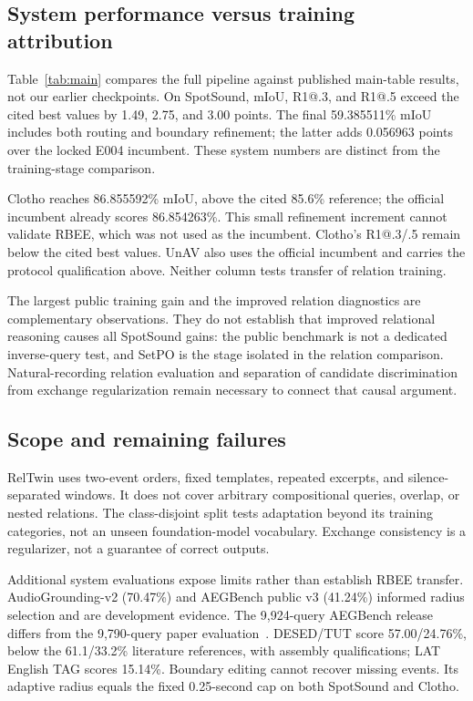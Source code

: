 \subsection{System performance versus training attribution}
Table~\ref{tab:main} compares the full pipeline against published main-table results, not our earlier checkpoints. On SpotSound, mIoU, R1@.3, and R1@.5 exceed the cited best values by 1.49, 2.75, and 3.00 points. The final 59.385511\% mIoU includes both routing and boundary refinement; the latter adds 0.056963 points over the locked E004 incumbent. These system numbers are distinct from the training-stage comparison.

Clotho reaches 86.855592\% mIoU, above the cited 85.6\% reference; the official incumbent already scores 86.854263\%. This small refinement increment cannot validate RBEE, which was not used as the incumbent. Clotho's R1@.3/.5 remain below the cited best values. UnAV also uses the official incumbent and carries the protocol qualification above. Neither column tests transfer of relation training.

The largest public training gain and the improved relation diagnostics are complementary observations. They do not establish that improved relational reasoning causes all SpotSound gains: the public benchmark is not a dedicated inverse-query test, and SetPO is the stage isolated in the relation comparison. Natural-recording relation evaluation and separation of candidate discrimination from exchange regularization remain necessary to connect that causal argument.

\subsection{Scope and remaining failures}
RelTwin uses two-event orders, fixed templates, repeated excerpts, and silence-separated windows. It does not cover arbitrary compositional queries, overlap, or nested relations. The class-disjoint split tests adaptation beyond its training categories, not an unseen foundation-model vocabulary. Exchange consistency is a regularizer, not a guarantee of correct outputs.

Additional system evaluations expose limits rather than establish RBEE transfer. AudioGrounding-v2 (70.47\%) and AEGBench public v3 (41.24\%) informed radius selection and are development evidence. The 9,924-query AEGBench release differs from the 9,790-query paper evaluation~\cite{zhang2026autoaeg}. DESED/TUT score 57.00/24.76\%, below the 61.1/33.2\% literature references, with assembly qualifications; LAT English TAG scores 15.14\%. Boundary editing cannot recover missing events. Its adaptive radius equals the fixed 0.25-second cap on both SpotSound and Clotho.
